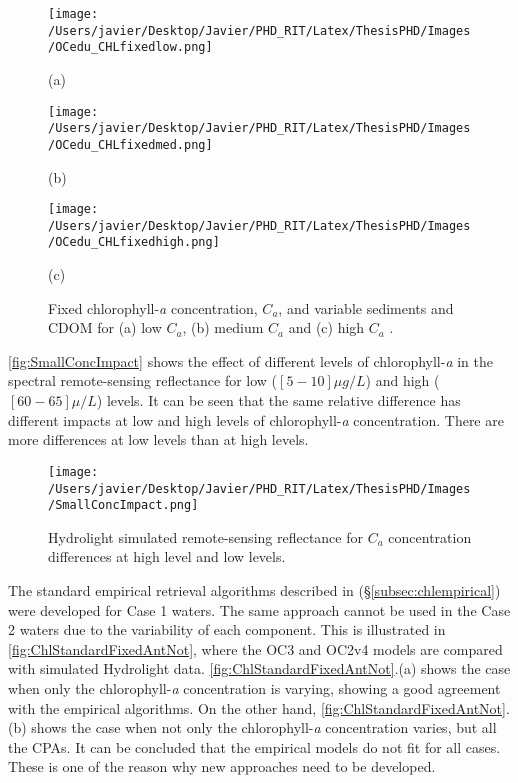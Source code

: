 \begin{figure}[htb]
  \begin{minipage}[c]{0.48\linewidth}
    \centering
      \texttt{[image: /Users/javier/Desktop/Javier/PHD\_RIT/Latex/ThesisPHD/Images/OCedu\_CHLfixedlow.png]}\\
      \centerline{(a)}\medskip
    \end{minipage} 
   \hfill   
   \begin{minipage}[c]{0.48\linewidth}
    \centering
      \texttt{[image: /Users/javier/Desktop/Javier/PHD\_RIT/Latex/ThesisPHD/Images/OCedu\_CHLfixedmed.png]}\\
      \centerline{(b)}\medskip
  \end{minipage}    
  \begin{minipage}[c]{1.0\linewidth}
    \centering
      \texttt{[image: /Users/javier/Desktop/Javier/PHD\_RIT/Latex/ThesisPHD/Images/OCedu\_CHLfixedhigh.png]}\\
      \centerline{(c)}\medskip
  \end{minipage}    
      \caption{Fixed chlorophyll-{\it a} concentration, $C_a$, and variable sediments and CDOM for (a) low $C_a$, (b) medium $C_a$ and (c) high $C_a$ .\label{fig:OCedu_CHLfixed} }
\end{figure}
\autoref{fig:SmallConcImpact} shows the effect of different levels of chlorophyll-{\it a} in the spectral remote-sensing reflectance for low ($[5-10] \mu g/L$) and high ($[60-65]\mu/L$) levels. It can be seen that the same relative difference has different impacts at low and high levels of chlorophyll-{\it a} concentration. There are more differences at low levels than at high levels.
\begin{figure}[htb!]
\centering
      \texttt{[image: /Users/javier/Desktop/Javier/PHD\_RIT/Latex/ThesisPHD/Images/SmallConcImpact.png]}
      \caption{Hydrolight simulated remote-sensing reflectance for $C_a$ concentration differences at high level and low levels.\label{fig:SmallConcImpact} } 
\end{figure}

The standard empirical retrieval algorithms described in \citet{OReilly2000} (\S\ref{subsec:chlempirical}) were developed for Case 1 waters. The same approach cannot be used in the Case 2 waters due to the variability of each component. This is illustrated in \autoref{fig:ChlStandardFixedAntNot}, where the OC3 and OC2v4 models are compared with simulated Hydrolight data. \autoref{fig:ChlStandardFixedAntNot}.(a) shows the case when only the chlorophyll-{\it a} concentration is varying, showing a good agreement with the empirical algorithms. On the other hand, \autoref{fig:ChlStandardFixedAntNot}.(b) shows the case when not only the chlorophyll-{\it a} concentration varies, but all the CPAs. It can be concluded that the empirical models do not fit for all cases. These is one of the reason why new approaches need to be developed.

